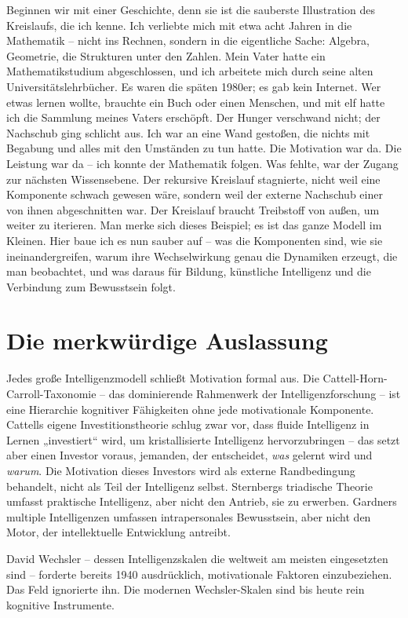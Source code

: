 \documentclass[11pt, twoside, openright]{book}
\begin{document}
Beginnen wir mit einer Geschichte, denn sie ist die sauberste Illustration des Kreislaufs, die ich kenne. Ich verliebte mich mit etwa acht Jahren in die Mathematik -- nicht ins Rechnen, sondern in die eigentliche Sache: Algebra, Geometrie, die Strukturen unter den Zahlen. Mein Vater hatte ein Mathematikstudium abgeschlossen, und ich arbeitete mich durch seine alten Universitätslehrbücher. Es waren die späten 1980er; es gab kein Internet. Wer etwas lernen wollte, brauchte ein Buch oder einen Menschen, und mit elf hatte ich die Sammlung meines Vaters erschöpft. Der Hunger verschwand nicht; der Nachschub ging schlicht aus. Ich war an eine Wand gestoßen, die nichts mit Begabung und alles mit den Umständen zu tun hatte. Die Motivation war da. Die Leistung war da -- ich konnte der Mathematik folgen. Was fehlte, war der Zugang zur nächsten Wissensebene. Der rekursive Kreislauf stagnierte, nicht weil eine Komponente schwach gewesen wäre, sondern weil der externe Nachschub einer von ihnen abgeschnitten war. Der Kreislauf braucht Treibstoff von außen, um weiter zu iterieren. Man merke sich dieses Beispiel; es ist das ganze Modell im Kleinen. Hier baue ich es nun sauber auf -- was die Komponenten sind, wie sie ineinandergreifen, warum ihre Wechselwirkung genau die Dynamiken erzeugt, die man beobachtet, und was daraus für Bildung, künstliche Intelligenz und die Verbindung zum Bewusstsein folgt.

\section*{Die merkwürdige Auslassung}

Jedes große Intelligenzmodell schließt Motivation formal aus. Die Cattell-Horn-Carroll-Taxonomie -- das dominierende Rahmenwerk der Intelligenzforschung -- ist eine Hierarchie kognitiver Fähigkeiten ohne jede motivationale Komponente. Cattells eigene Investitionstheorie schlug zwar vor, dass fluide Intelligenz in Lernen „investiert“ wird, um kristallisierte Intelligenz hervorzubringen -- das setzt aber einen Investor voraus, jemanden, der entscheidet, \textit{was} gelernt wird und \textit{warum}. Die Motivation dieses Investors wird als externe Randbedingung behandelt, nicht als Teil der Intelligenz selbst. Sternbergs triadische Theorie umfasst praktische Intelligenz, aber nicht den Antrieb, sie zu erwerben. Gardners multiple Intelligenzen umfassen intrapersonales Bewusstsein, aber nicht den Motor, der intellektuelle Entwicklung antreibt.

David Wechsler -- dessen Intelligenzskalen die weltweit am meisten eingesetzten sind -- forderte bereits 1940 ausdrücklich, motivationale Faktoren einzubeziehen. Das Feld ignorierte ihn. Die modernen Wechsler-Skalen sind bis heute rein kognitive Instrumente.
\end{document}
